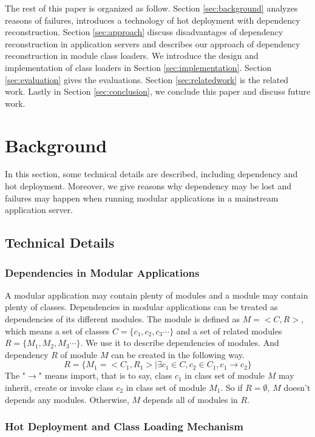 \documentclass[conference]{IEEEtran}
\begin{document}
The rest of this paper is organized as follow. 
Section \ref{sec:background} analyzes reasons of failures, introduces a technology of hot deployment with dependency reconstruction. 
Section \ref{sec:approach} discuss disadvantages of dependency reconstruction in application servers and describes our approach of dependency reconstruction in module class loaders.
We introduce the design and implementation of class loaders in Section \ref{sec:implementation}.
Section \ref{sec:evaluation} gives the evaluations.
Section \ref{sec:relatedwork} is the related work.
Lastly in Section \ref{sec:conclusion}, we conclude this paper and discuss future work.



\section{Background\label{sec:background}}
In this section, some technical details are described, including dependency and hot deployment.
Moreover, we give reasons why dependency may be lost and failures may happen when running modular applications in a mainstream application server.

\subsection{Technical Details}

\subsubsection{Dependencies in Modular Applications} 

A modular application may contain plenty of modules and a module may contain plenty of classes.
Dependencies in modular applications can be treated as dependencies of its different modules.
The module is defined as $M=<C, R>$, which means a set of classes $C=\{c_1, c_2, c_3\cdots\}$ and a set of related modules $R=\{M_1, M_2, M_3\cdots\}$.
We use it to describe dependencies of modules.
And dependency $R$ of module $M$ can be created in the following way.
$$R=\{M_1=<C_1, R_1> \mid \exists c_1 \in C, c_2 \in C_1, c_1 \rightarrow c_2\}$$
The "$\rightarrow$" means import, that is to say, class $c_1$ in class set of module $M$ may inherit, create or invoke class $c_2$ in class set of module $M_1$. 
So if $R=\emptyset$, $M$ doesn't depends any modules.
Otherwise, $M$ depends all of modules in $R$.

\subsubsection{Hot Deployment and Class Loading Mechanism}
\end{document}

